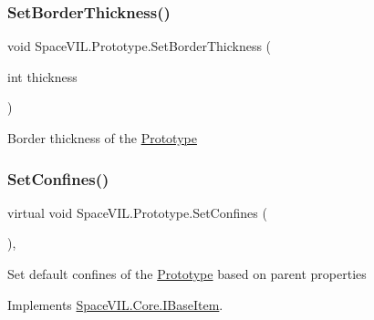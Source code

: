 \mbox{\label{class_space_v_i_l_1_1_prototype_a3409ace379b42bc27dc088ea3b5d2c16}} 
\subsubsection{\texorpdfstring{Set\+Border\+Thickness()}{SetBorderThickness()}}
{\footnotesize\ttfamily void Space\+V\+I\+L.\+Prototype.\+Set\+Border\+Thickness (\begin{DoxyParamCaption}\item[{int}]{thickness }\end{DoxyParamCaption})\hspace{0.3cm}{\ttfamily [inline]}}



Border thickness of the \mbox{\hyperlink{class_space_v_i_l_1_1_prototype}{Prototype}} 

\mbox{\label{class_space_v_i_l_1_1_prototype_af063fd80d51a3c42c8f43e0e97b6b809}} 
\subsubsection{\texorpdfstring{Set\+Confines()}{SetConfines()}\hspace{0.1cm}{\footnotesize\ttfamily [1/2]}}
{\footnotesize\ttfamily virtual void Space\+V\+I\+L.\+Prototype.\+Set\+Confines (\begin{DoxyParamCaption}{ }\end{DoxyParamCaption})\hspace{0.3cm}{\ttfamily [inline]}, {\ttfamily [virtual]}}



Set default confines of the \mbox{\hyperlink{class_space_v_i_l_1_1_prototype}{Prototype}} based on parent properties 



Implements \mbox{\hyperlink{interface_space_v_i_l_1_1_core_1_1_i_base_item}{Space\+V\+I\+L.\+Core.\+I\+Base\+Item}}.



